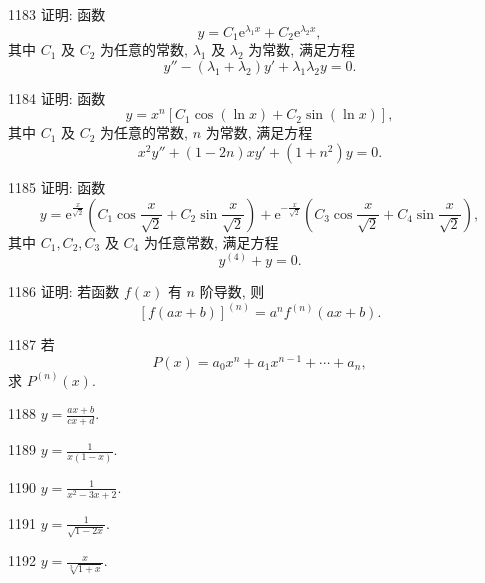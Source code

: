 \begin{prob}[M]{1183}
证明: 函数
\[
y = C_1\mathrm{e}^{\lambda_1 x} + C_2\mathrm{e}^{\lambda_2 x},
\]
其中 $C_1$ 及 $C_2$ 为任意的常数, $\lambda_1$ 及 $\lambda_2$ 为常数, 满足方程
\[
y'' - (\lambda_1 + \lambda_2)y' + \lambda_1\lambda_2 y = 0.
\]
\end{prob}

\begin{prob}[M]{1184}
证明: 函数
\[
y = x^n[C_1\cos(\ln x) + C_2\sin(\ln x)],
\]
其中 $C_1$ 及 $C_2$ 为任意的常数, $n$ 为常数, 满足方程
\[
x^2 y'' + (1 - 2n)xy' + (1 + n^2)y = 0.
\]
\end{prob}

\begin{prob}[L]{1185}
证明: 函数
\[
y = \mathrm{e}^{\frac{x}{\sqrt{2}}}\left(C_1\cos\frac{x}{\sqrt{2}} + C_2\sin\frac{x}{\sqrt{2}}\right) + \mathrm{e}^{-\frac{x}{\sqrt{2}}}\left(C_3\cos\frac{x}{\sqrt{2}} + C_4\sin\frac{x}{\sqrt{2}}\right),
\]
其中 $C_1, C_2, C_3$ 及 $C_4$ 为任意常数, 满足方程
\[
y^{(4)} + y = 0.
\]
\end{prob}

\begin{prob}[M]{1186}
证明: 若函数 $f(x)$ 有 $n$ 阶导数, 则
\[
[f(ax + b)]^{(n)} = a^n f^{(n)}(ax + b).
\]
\end{prob}

\begin{prob}[M]{1187}
若
\[
P(x) = a_0 x^n + a_1 x^{n-1} + \cdots + a_n,
\]
求 $P^{(n)}(x)$.
\end{prob}


\begin{prob}[S]{1188}
$y = \frac{ax + b}{cx + d}$.
\end{prob}

\begin{prob}[S]{1189}
$y = \frac{1}{x(1 - x)}$.
\end{prob}

\begin{prob}[M]{1190}
$y = \frac{1}{x^2 - 3x + 2}$.
\end{prob}

\begin{prob}[S]{1191}
$y = \frac{1}{\sqrt{1 - 2x}}$.
\end{prob}

\begin{prob}[S]{1192}
$y = \frac{x}{\sqrt[3]{1 + x}}$.
\end{prob}

